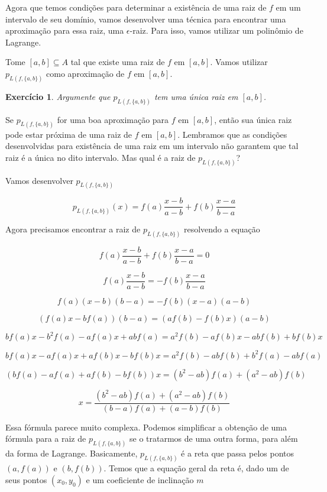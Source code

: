 \documentclass[]{article}
\newtheorem{exercicio}{Exercício}
\numberwithin{equation}{section}
\begin{document}
Agora que temos condições para determinar a existência de uma raiz de $f$ em um intervalo de seu domínio, vamos desenvolver uma técnica para encontrar uma aproximação para essa raiz, uma $\epsilon$-raiz. Para isso, vamos utilizar um polinômio de Lagrange.

Tome $[a, b] \subseteq A$ tal que existe uma raiz de $f$ em $[a, b]$. Vamos utilizar $p_{L(f, \{a, b\})}$ como aproximação de $f$ em $[a, b]$.

\begin{exercicio}
	Argumente que $p_{L(f, \{a, b\})}$ tem uma única raiz em $[a, b]$.
\end{exercicio}

Se $p_{L(f, \{a, b\})}$ for uma boa aproximação para $f$ em $[a, b]$, então sua única raiz pode estar próxima de uma raiz de $f$ em $[a, b]$. Lembramos que as condições desenvolvidas para existência de uma raiz em um intervalo não garantem que tal raiz é a única no dito intervalo. Mas qual é a raiz de $p_{L(f, \{a, b\})}$?

Vamos desenvolver $p_{L(f, \{a, b\})}$

$$
p_{L(f, \{a, b\})}(x) = f(a) \frac{x - b}{a - b} + f(b) \frac{x - a}{b - a}
$$

Agora precisamos encontrar a raiz de $p_{L(f, \{a, b\})}$ resolvendo a equação

$$
f(a) \frac{x - b}{a - b} + f(b) \frac{x - a}{b - a} = 0
$$

$$
f(a) \frac{x - b}{a - b} = -f(b) \frac{x - a}{b - a}
$$

$$
f(a)(x - b)(b - a) = -f(b)(x - a)(a - b)
$$

$$
(f(a)x - bf(a))(b - a) = (af(b) - f(b)x)(a - b)
$$

$$
bf(a)x - b^2f(a) - af(a)x + abf(a) = a^2f(b) - af(b)x - abf(b) + bf(b)x
$$

$$
bf(a)x - af(a)x + af(b)x - bf(b)x = a^2f(b) - abf(b) + b^2f(a) - abf(a)
$$

$$
(bf(a) - af(a) + af(b) - bf(b))x = (b^2 - ab)f(a) + (a^2 - ab)f(b)
$$

$$
x = \frac{(b^2 - ab)f(a) + (a^2 - ab)f(b)}{(b - a)f(a) + (a - b)f(b)}
$$

Essa fórmula parece muito complexa. Podemos simplificar a obtenção de uma fórmula para a raiz de $p_{L(f, \{a, b\})}$ se o tratarmos de uma outra forma, para além da forma de Lagrange. Basicamente, $p_{L(f, \{a, b\})}$ é a reta que passa pelos pontos $(a, f(a))$ e $(b, f(b))$. Temos que a equação geral da reta é, dado um de seus pontos $(x_0, y_0)$ e um coeficiente de inclinação $m$
\end{document}
